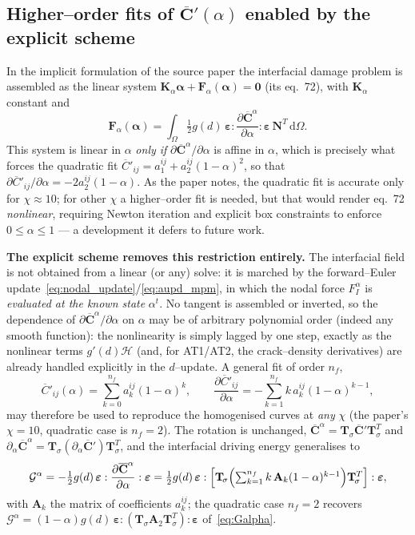 \documentclass[12pt,a4paper]{article}
\newcommand{\beps}{\boldsymbol{\varepsilon}}
\newcommand{\bN}{\mathbf{N}}
\newcommand{\bK}{\mathbf{K}}
\newcommand{\Ca}{\overline{\mathbf{C}}^{\alpha}}     %
\newcommand{\Cp}{\overline{\mathbf{C}}'}             %
\newcommand{\Tsig}{\mathbf{T}_{\!\sigma}}            %
\newcommand{\dd}{\,\mathrm{d}}
\begin{document}
	\subsection{Higher--order fits of $\Cp(\alpha)$ enabled by the explicit scheme}\label{sec:hofit}

	In the implicit formulation of the source paper the interfacial damage problem
	is assembled as the linear system $\bK_\alpha\boldsymbol{\alpha}+\mathbf{F}_\alpha(\boldsymbol{\alpha})=\mathbf 0$
	(its eq.~72), with $\bK_\alpha$ constant and
	\begin{equation}\label{eq:Falpha_impl}
		\mathbf F_\alpha(\boldsymbol\alpha)=\int_{\Omega}\tfrac12 g(d)\,\beps:\frac{\partial\Ca}{\partial\alpha}:\beps\,\bN^{T}\dd\Omega .
	\end{equation}
	This system is linear in $\alpha$ \emph{only if} $\partial\Ca/\partial\alpha$ is
	affine in $\alpha$, which is precisely what forces the quadratic fit
	$\overline C'_{ij}=a_1^{ij}+a_2^{ij}(1-\alpha)^2$, so that
	$\partial\overline C'_{ij}/\partial\alpha=-2a_2^{ij}(1-\alpha)$. As the paper
	notes, the quadratic fit is accurate only for $\chi\approx10$; for other $\chi$ a
	higher--order fit is needed, but that would render eq.~72 \emph{nonlinear},
	requiring Newton iteration and explicit box constraints to enforce
	$0\le\alpha\le1$ --- a development it defers to future work.

	\textbf{The explicit scheme removes this restriction entirely.} The interfacial
	field is not obtained from a linear (or any) solve: it is marched by the
	forward--Euler update~\eqref{eq:nodal_update}/\eqref{eq:aupd_mpm}, in which the
	nodal force $F_I^\alpha$ is \emph{evaluated at the known state} $\alpha^t$. No
	tangent is assembled or inverted, so the dependence of $\partial\Ca/\partial\alpha$
	on $\alpha$ may be of arbitrary polynomial order (indeed any smooth function):
	the nonlinearity is simply lagged by one step, exactly as the nonlinear terms
	$g'(d)\mathcal H$ (and, for AT1/AT2, the crack--density derivatives) are already
	handled explicitly in the $d$--update. A general fit of order $n_f$,
	\begin{equation}\label{eq:genfit}
		\overline C'_{ij}(\alpha)=\sum_{k=0}^{n_f} a_k^{ij}(1-\alpha)^k,
		\qquad
		\frac{\partial\overline C'_{ij}}{\partial\alpha}=-\sum_{k=1}^{n_f} k\,a_k^{ij}(1-\alpha)^{k-1},
	\end{equation}
	may therefore be used to reproduce the homogenised curves at \emph{any} $\chi$
	(the paper's $\chi=10$, quadratic case is $n_f=2$). The rotation is unchanged,
	$\Ca=\Tsig\Cp\Tsig^{T}$ and
	$\partial_\alpha\Ca=\Tsig(\partial_\alpha\Cp)\Tsig^{T}$, and the interfacial
	driving energy generalises to
	\begin{equation}\label{eq:Ggen}
		\mathcal G^\alpha=-\tfrac12 g(d)\,\beps:\frac{\partial\Ca}{\partial\alpha}:\beps
		=\tfrac12 g(d)\,\beps:\Bigl[\Tsig\Bigl(\textstyle\sum_{k=1}^{n_f}k\,\mathbf A_k(1-\alpha)^{k-1}\Bigr)\Tsig^{T}\Bigr]:\beps,
	\end{equation}
	with $\mathbf A_k$ the matrix of coefficients $a_k^{ij}$; the quadratic case
	$n_f=2$ recovers $\mathcal G^\alpha=(1-\alpha)g(d)\,\beps:(\Tsig\mathbf A_2\Tsig^{T}):\beps$
	of~\eqref{eq:Galpha}.
\end{document}
